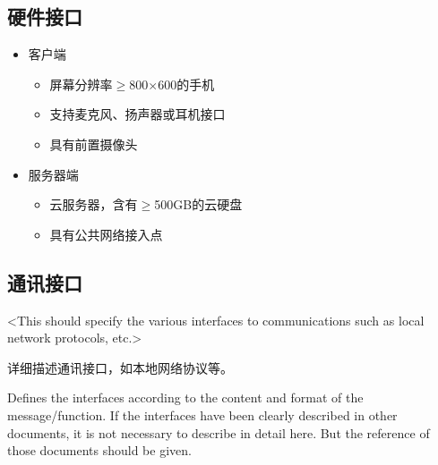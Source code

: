 \subsection{硬件接口}
\iffalse
<The interface with other hardware components should be explained in detail. >

详细描述与硬件的接口

Describes the logical features of the interface between the software and hardware components, including the equipment supported and how the equipment and protocol is supported. 

Defines the interfaces according to the content and format of the software/hardware protocol. If the interfaces have been clearly described in other documents, it is not necessary to describe in detail here. But the reference of those documents should be given.

在此描述软件产品和系统硬件组件之间接口的逻辑特征，也包括支持哪些设备、怎样支持这些设备和协议等。
 
按软/硬件协议内容和格式定义接口。如果接口已在其它文档中很清楚地描述，就没有必要在这儿进行详细描述，但需说明应参考的文档。
\fi
\begin{itemize}
	\item 客户端
	\begin{itemize}
		\item 屏幕分辨率$\ge$800$\times$600的手机
		\item 支持麦克风、扬声器或耳机接口
		\item 具有前置摄像头
	\end{itemize}
	\item 服务器端
	\begin{itemize}
		\item 云服务器，含有$\ge$500GB的云硬盘
		\item 具有公共网络接入点
	\end{itemize}
\end{itemize}
\subsection{通讯接口}
\iffalse
<This should specify the various interfaces to communications such as local network protocols, etc.>

详细描述通讯接口，如本地网络协议等。

Defines the interfaces according to the content and format of the message/function. If the interfaces have been clearly described in other documents, it is not necessary to describe in detail here. But the reference of those documents should be given.

